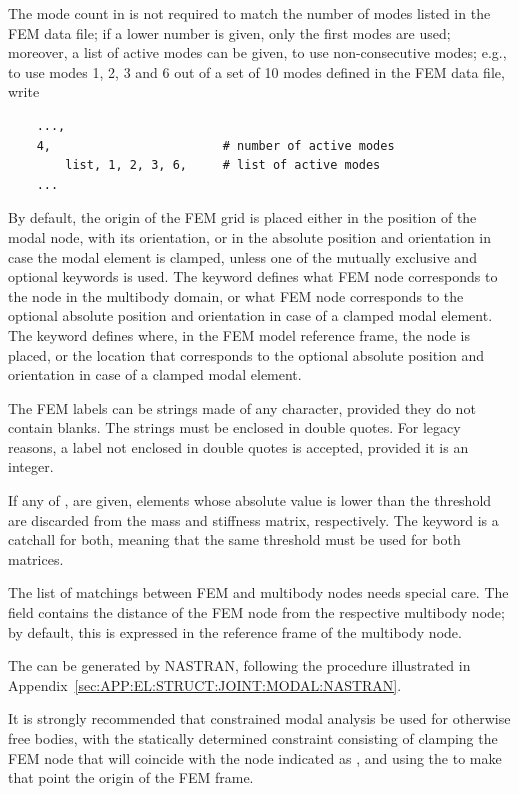 The mode count in  is not required to match
the number of modes listed in the FEM data file; if a lower number
is given, only the first  modes are used;
moreover, a list of active modes can be given, to use non-consecutive
modes; e.g., to use modes 1, 2, 3 and 6 out of a set of 10 modes
defined in the FEM data file, write
\begin{verbatim}
    ...,
    4,                        # number of active modes
        list, 1, 2, 3, 6,     # list of active modes
    ...
\end{verbatim}

By default, the origin of the FEM grid is placed either in the position
of the modal node, with its orientation, or in the absolute position 
and orientation in case the modal element is clamped, 
unless one of the mutually exclusive  
and  optional keywords is used.
The  keyword defines what FEM node corresponds 
to the  node in the multibody domain,
or what FEM node corresponds to the optional absolute position 
and orientation in case of a clamped modal element.
The  keyword defines where, in the FEM model
reference frame, the  node is placed, or the location
that corresponds to the optional absolute position and orientation
in case of a clamped modal element.

The FEM labels can be strings made of any character,
provided they do not contain blanks.
The strings must be enclosed in double quotes.
For legacy reasons, a label not enclosed in double quotes
is accepted, provided it is an integer.

If any of ,  are given,
elements whose absolute value is lower than the threshold
are discarded from the mass and stiffness matrix, respectively.
The keyword  is a catchall for both,
meaning that the same threshold must be used for both matrices.

The list of matchings between FEM and multibody nodes needs
special care.
The  field contains the distance
of the FEM node from the respective multibody node; by default,
this is expressed in the reference frame of the multibody node.

The  can be generated by NASTRAN, 
following the procedure illustrated
in Appendix~\ref{sec:APP:EL:STRUCT:JOINT:MODAL:NASTRAN}.

It is strongly recommended that constrained modal analysis
be used for otherwise free bodies, with the statically 
determined constraint consisting of clamping the FEM node 
that will coincide with the node indicated as ,
and using the  to make that point the origin
of the FEM frame.

